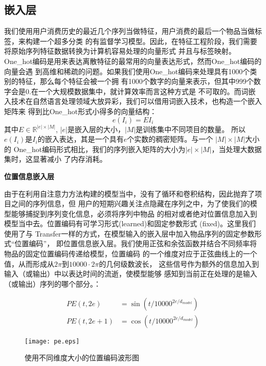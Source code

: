 \subsection{嵌入层}

我们使用用户消费历史的最近几个序列当做特征，用户消费的最后一个物品当做标签，来构建一个超多分类%
的有监督学习模型。因此，在特征工程阶段，我们需要将原始序列特征数据转换为计算机容易处理的向量形式%
并且与标签映射。One\_hot编码是用来表达离散特征的最常用的向量表达形式，然而One\_hot编码的向量会遇%
到高维和稀疏的问题。如果我们使用One\_hot编码来处理具有1000个类别的特征，那么每个特征会被一个拥%
有1000个数字的向量来表示，但其中999个数字会是0.在一个大规模数据集中，就计算效率而言这种方式是%
不可取的。而词嵌入技术在自然语言处理领域大放异彩，我们可以借用词嵌入技术，也构造一个嵌入矩阵来%
得到比One\_hot形式小得多的向量结构：
$$
e(I_i) = EI_i
$$
其中$E\in \mathbb{R}^{|e|\times |M|}$, $|e|$是嵌入层的大小，$|M|$是训练集中不同项目的数量。%
所以$e(I_i)$是$I_i$的嵌入表达，其是一个具有$e$个实数的稠密矩阵。与一个 $|M|\times |M|$大小的%
One\_hot编码形式相比，我们的序列嵌入矩阵的大小为$|e|\times |M|$，当处理大数据集时，这显著减小%
了内存消耗。

\textbf{位置信息嵌入层}

由于在利用自注意力方法构建的模型当中，没有了循环和卷积结构，因此抛弃了项目之间的序列信息，但%
用户的短期兴趣关注点隐藏在序列之中，为了使我们的模型能够捕捉到序列变化信息，必须将序列中物品%
的相对或者绝对位置信息加入到模型当中去。位置编码有可学习形式(learned)和固定参数形式%
(fixed)。这里我们使用了与%
Transfer一样的方式，在模型输入的嵌入层中加入物品序列的固定参数形式“位置编码”，%
即位置信息嵌入层。我们使用正弦和余弦函数并结合不同频率将物品的固定位置编码传递给模型，位置编码%
的一个维度对应于正弦曲线上的一个值，从而形成从$2\pi $到$10000 \cdot  2\pi$的几何级数波长，%
这些信号作为额外的信息加入到输入（或输出）中以表达时间的流逝，使模型能够%
感知到当前正在处理的是输入（或输出）序列的哪个部分。：

\begin{align}
  PE(t,2e) &= \sin (t/10000^{2e/d_{model}}) \label{eq:sin}\\
  PE(t,2e+1) &= \cos (t/10000^{2e/d_{model}}) \label{con}
\end{align}

\begin{figure}
\centering
\texttt{[image: pe.eps]}
\caption{使用不同维度大小的位置编码波形图}
\label{pe}
\end{figure}

